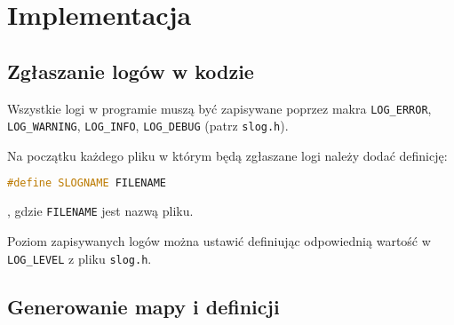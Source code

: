 \newpage

\section{Implementacja}
\label{Sec_Implementacja}

\subsection{Zgłaszanie logów w kodzie}
Wszystkie logi w programie muszą być zapisywane poprzez makra \texttt{LOG\_ERROR}, \texttt{LOG\_WARNING}, \texttt{LOG\_INFO}, \texttt{LOG\_DEBUG} (patrz \texttt{slog.h}).

Na początku każdego pliku w którym będą zgłaszane logi należy dodać definicję:
\begin{lstlisting}[language=c++]
#define SLOGNAME FILENAME
\end{lstlisting}
, gdzie \texttt{FILENAME} jest nazwą pliku.

Poziom zapisywanych logów można ustawić definiując odpowiednią wartość w \texttt{LOG\_LEVEL} z pliku \texttt{slog.h}.

\subsection{Generowanie mapy i definicji}
\TODO
